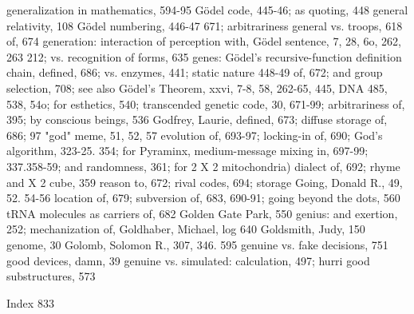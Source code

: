 generalization in mathematics, 594-95            Gödel code, 445-46; as quoting, 448
general relativity, 108                          Gödel numbering, 446-47 671; arbitrariness
general vs. troops, 618                           of, 674
generation: interaction of perception with,      Gödel sentence, 7, 28, 6o, 262, 263
 212; vs. recognition of forms, 635 genes:       Gödel’s recursive-function definition chain,
 defined, 686; vs. enzymes, 441; static nature 448-49
 of, 672; and group selection, 708; see also     Gödel’s Theorem, xxvi, 7-8, 58, 262-65, 445,
 DNA                                             485, 538, 54o; for esthetics, 540; transcended
genetic code, 30, 671-99; arbitrariness of, 395; by conscious beings, 536 Godfrey, Laurie,
 defined, 673; diffuse storage of, 686;           97 "god" meme, 51, 52, 57
 evolution of, 693-97; locking-in of, 690;       God's algorithm, 323-25. 354; for Pyraminx,
 medium-message mixing in, 697-99;                337.358-59; and randomness, 361; for 2 X 2
 mitochondria) dialect of, 692; rhyme and         X 2 cube, 359
 reason to, 672; rival codes, 694; storage       Going, Donald R., 49, 52. 54-56
 location of, 679; subversion of, 683, 690-91; going beyond the dots, 560
 tRNA molecules as carriers of, 682              Golden Gate Park, 550
genius: and exertion, 252; mechanization of,     Goldhaber, Michael, log
 640                                             Goldsmith, Judy, 150
genome, 30                                       Golomb, Solomon R., 307, 346. 595
genuine vs. fake decisions, 751                  good devices, damn, 39
genuine vs. simulated: calculation, 497; hurri good substructures, 573

 Index                                                                                      833

